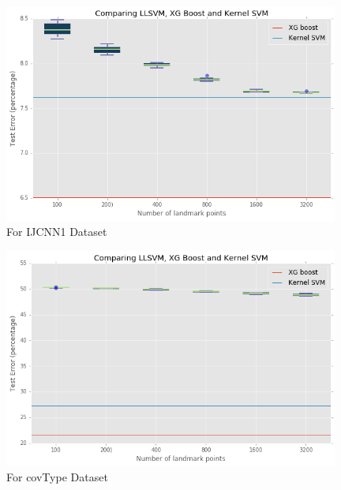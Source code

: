 \documentclass[12pt]{article}
\begin{document}
\begin{figure}[h]
	\centering
	\includegraphics[width=11cm]{../Results/box_plot_1}
	\caption{For IJCNN1 Dataset}
\end{figure}

\begin{figure}[h]
	\centering
	\includegraphics[width=11cm]{../Results/box_plot_2}
	\caption{For covType Dataset}
\end{figure}
\end{document}
